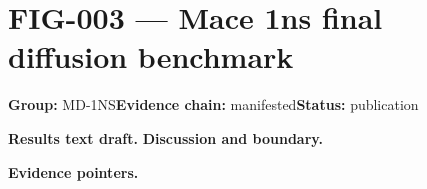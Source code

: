 \clearpage
\section{FIG-003 --- Mace 1ns final diffusion benchmark}
\label{figpage:fig-003}
\textbf{Group:} MD-1NS\quad \textbf{Evidence chain:} manifested\quad \textbf{Status:} publication

\textbf{Results text draft.} 
\textbf{Discussion and boundary.} 


\textbf{Evidence pointers.}



\vfill
